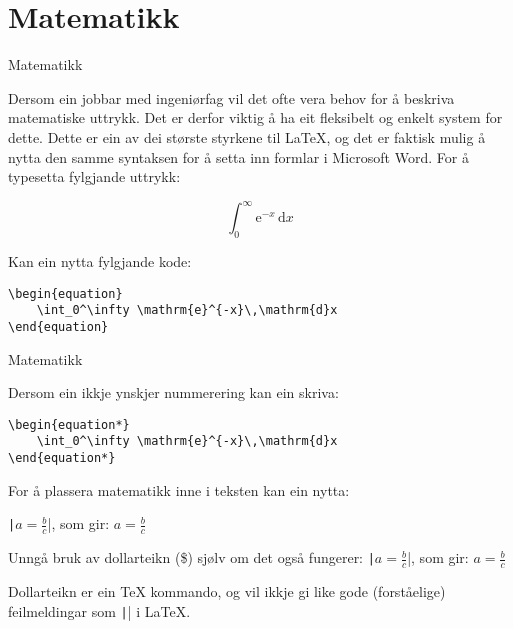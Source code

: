 \section{Matematikk}

	\begin{frame}[containsverbatim]{Matematikk}
	
	Dersom ein jobbar med ingeniørfag vil det ofte vera behov for å beskriva matematiske uttrykk. Det er derfor viktig å ha eit fleksibelt og enkelt system for dette. Dette er ein av dei største styrkene til \LaTeX, og det er faktisk mulig å nytta den samme syntaksen for å setta inn formlar i Microsoft Word. For å typesetta fylgjande uttrykk:
	
	\begin{equation}
		\int_0^\infty \mathrm{e}^{-x}\,\mathrm{d}x
	\end{equation}
	
	Kan ein nytta fylgjande kode:
	
	\begin{verbatim}
\begin{equation}
	\int_0^\infty \mathrm{e}^{-x}\,\mathrm{d}x
\end{equation}
	\end{verbatim}
	
\end{frame}




\begin{frame}[containsverbatim]{Matematikk}
	
	Dersom ein ikkje ynskjer nummerering kan ein skriva:
	
	\begin{verbatim}
\begin{equation*}
	\int_0^\infty \mathrm{e}^{-x}\,\mathrm{d}x
\end{equation*}
	\end{verbatim}
	
	For å plassera matematikk inne i teksten kan ein nytta:
	
	\texttt|\(a = \frac{b}{c}\)|, som gir: \(a = \frac{b}{c}\)
	
	Unngå bruk av dollarteikn (\$) sjølv om det også fungerer:
	\texttt|$a = \frac{b}{c}$|, som gir: $a = \frac{b}{c}$
	
	Dollarteikn er ein \TeX{} kommando, og vil ikkje gi like gode (forståelige) feilmeldingar som \texttt|\(\)| i \LaTeX{}.
	
	
	
\end{frame}



